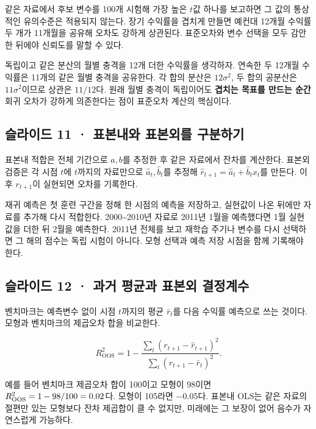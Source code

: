 \documentclass[11pt,a4paper]{article}
\begin{document}
같은 자료에서 후보 변수를 100개 시험해 가장 높은 $t$값 하나를 보고하면 그 값의 통상적인 유의수준은 적용되지 않는다. 장기 수익률을 겹치게 만들면 예컨대 12개월 수익률 두 개가 11개월을 공유해 오차도 강하게 상관된다. 표준오차와 변수 선택을 모두 감안한 뒤에야 신뢰도를 말할 수 있다.\par

독립이고 같은 분산의 월별 충격을 12개 더한 수익률을 생각하자. 연속한 두 12개월 수익률은 11개의 같은 월별 충격을 공유한다. 각 합의 분산은 $12\sigma^2$, 두 합의 공분산은 $11\sigma^2$이므로 상관은 $11/12$다. 원래 월별 충격이 독립이어도 \textbf{겹치는 목표를 만드는 순간} 회귀 오차가 강하게 의존한다는 점이 표준오차 계산의 핵심이다.\par

\subsection{슬라이드 11 · 표본내와 표본외를 구분하기}
표본내 적합은 전체 기간으로 $a,b$를 추정한 후 같은 자료에서 잔차를 계산한다. 표본외 검증은 각 시점 $t$에 $t$까지의 자료만으로 $\hat a_t,\hat b_t$를 추정해 $\hat r_{t+1}=\hat a_t+\hat b_tx_t$를 만든다. 이후 $r_{t+1}$이 실현되면 오차를 기록한다.\par

재귀 예측은 첫 훈련 구간을 정해 한 시점의 예측을 저장하고, 실현값이 나온 뒤에만 자료를 추가해 다시 적합한다. 2000\~{}2010년 자료로 2011년 1월을 예측했다면 1월 실현값을 더한 뒤 2월을 예측한다. 2011년 전체를 보고 재학습 주기나 변수를 다시 선택하면 그 해의 점수는 독립 시험이 아니다. 모형 선택과 예측 저장 시점을 함께 기록해야 한다.\par

\subsection{슬라이드 12 · 과거 평균과 표본외 결정계수}
벤치마크는 예측변수 없이 시점 $t$까지의 평균 $\bar r_t$를 다음 수익률 예측으로 쓰는 것이다. 모형과 벤치마크의 제곱오차 합을 비교한다.\par

\[
R^2_{\mathrm{OOS}}=1-
\frac{\sum_t(r_{t+1}-\hat r_{t+1})^2}
{\sum_t(r_{t+1}-\bar r_t)^2}.
\]

예를 들어 벤치마크 제곱오차 합이 100이고 모형이 98이면 $R^2_{\rm OOS}=1-98/100=0.02$다. 모형이 105라면 $-0.05$다. 표본내 OLS는 같은 자료의 절편만 있는 모형보다 잔차 제곱합이 클 수 없지만, 미래에는 그 보장이 없어 음수가 자연스럽게 가능하다.\par
\end{document}

